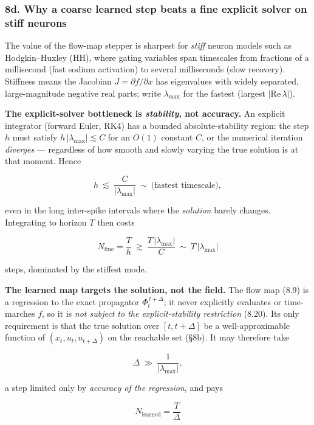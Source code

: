 \documentclass[
  11pt,
]{article}
\begin{document}
\subsubsection{8d. Why a coarse learned step beats a fine explicit
solver on stiff
neurons}\label{d.-why-a-coarse-learned-step-beats-a-fine-explicit-solver-on-stiff-neurons}

The value of the flow-map stepper is sharpest for \emph{stiff} neuron
models such as Hodgkin--Huxley (HH), where gating variables span
timescales from fractions of a millisecond (fast sodium activation) to
several milliseconds (slow recovery). Stiffness means the Jacobian
\(J=\partial f/\partial x\) has eigenvalues with widely separated,
large-magnitude negative real parts; write \(\lambda_{\max}\) for the
fastest (largest \(|\mathrm{Re}\,\lambda|\)).

\textbf{The explicit-solver bottleneck is \emph{stability}, not
accuracy.} An explicit integrator (forward Euler, RK4) has a bounded
absolute-stability region: the step \(h\) must satisfy
\(h\,|\lambda_{\max}|\lesssim C\) for an \(O(1)\) constant \(C\), or the
numerical iteration \emph{diverges} --- regardless of how smooth and
slowly varying the true solution is at that moment. Hence

\[
h\ \lesssim\ \frac{C}{|\lambda_{\max}|}\ \sim\ \big(\text{fastest timescale}\big),
\tag{8.20}
\]

even in the long inter-spike intervals where the \emph{solution} barely
changes. Integrating to horizon \(T\) then costs

\[
N_{\text{fine}}=\frac{T}{h}\ \gtrsim\ \frac{T\,|\lambda_{\max}|}{C}\ \sim\ T\,|\lambda_{\max}|
\tag{8.21}
\]

steps, dominated by the stiffest mode.

\textbf{The learned map targets the solution, not the field.} The flow
map (8.9) is a regression to the exact propagator
\(\Phi_{t}^{\,t+\Delta}\); it never explicitly evaluates or time-marches
\(f\), so it is \emph{not subject to the explicit-stability restriction}
(8.20). Its only requirement is that the true solution over
\([t,t+\Delta]\) be a well-approximable function of
\((x_{t},u_{t},u_{t+\Delta})\) on the reachable set (§8b). It may
therefore take

\[
\Delta\ \gg\ \frac{1}{|\lambda_{\max}|},
\tag{8.22}
\]

a step limited only by \emph{accuracy of the regression}, and pays

\[
N_{\text{learned}}=\frac{T}{\Delta}
\tag{8.23}
\]
\end{document}
